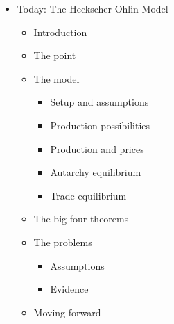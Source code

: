 \documentclass[ignorenonframetext,]{beamer}
\begin{document}
\begin{frame}
\begin{itemize}
\itemsep1pt\parskip0pt
\item
  Today: The Heckscher-Ohlin Model
  \begin{itemize}
        \item Introduction
        \item The point
        \item The model
        \begin{itemize}
            \item Setup and assumptions
            \item Production possibilities
            \item Production and prices
            \item Autarchy equilibrium
            \item Trade equilibrium
        \end{itemize}
        \item The big four theorems
        \item The problems 
        \begin{itemize}
            \item Assumptions
            \item Evidence
        \end{itemize}
        \item Moving forward
    \end{itemize}
\end{itemize}

\end{frame}
\end{document}
